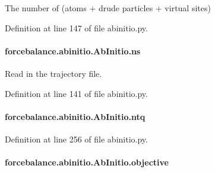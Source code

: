 The number of (atoms + drude particles + virtual sites) 



Definition at line 147 of file abinitio.\-py.

\hypertarget{classforcebalance_1_1abinitio_1_1AbInitio_a1e8248e2efe952362b1b21462a70b540}{
\paragraph[{ns}]{\setlength{\rightskip}{0pt plus 5cm}forcebalance.\-abinitio.\-Ab\-Initio.\-ns\hspace{0.3cm}{\ttfamily [inherited]}}}\label{classforcebalance_1_1abinitio_1_1AbInitio_a1e8248e2efe952362b1b21462a70b540}


Read in the trajectory file. 



Definition at line 141 of file abinitio.\-py.

\hypertarget{classforcebalance_1_1abinitio_1_1AbInitio_af8a895f61ddea6b9ca2765ddbf309a75}{
\paragraph[{ntq}]{\setlength{\rightskip}{0pt plus 5cm}forcebalance.\-abinitio.\-Ab\-Initio.\-ntq\hspace{0.3cm}{\ttfamily [inherited]}}}\label{classforcebalance_1_1abinitio_1_1AbInitio_af8a895f61ddea6b9ca2765ddbf309a75}


Definition at line 256 of file abinitio.\-py.

\hypertarget{classforcebalance_1_1abinitio_1_1AbInitio_acbbd447b9f66bc4699992f3b64bb256d}{
\paragraph[{objective}]{\setlength{\rightskip}{0pt plus 5cm}forcebalance.\-abinitio.\-Ab\-Initio.\-objective\hspace{0.3cm}{\ttfamily [inherited]}}}\label{classforcebalance_1_1abinitio_1_1AbInitio_acbbd447b9f66bc4699992f3b64bb256d}


